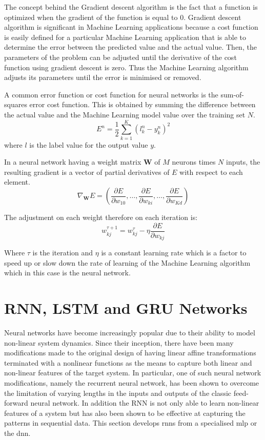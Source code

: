 The concept behind the Gradient descent algorithm is the fact that a function is optimized when the gradient of the function is equal to $0$.  Gradient descent algorithm is significant in Machine Learning applications because a cost function is easily defined for a particular Machine Learning application that is able to determine the error between the predicted value and the actual value.  Then, the parameters of the problem can be adjusted until the derivative of the cost function using gradient descent is zero.  Thus the Machine Learning algorithm adjusts its parameters until the error is minimised or removed.

A common error function or cost function for neural networks is the sum-of-squares error cost function.  This is obtained by summing the difference between the actual value and the Machine Learning model value over the training set $N$. 
\begin{equation}
E^n=\frac{1}{2}\sum_{k=1}^K(l_k^n-y_k^n)^2
\label{eqn_c3_nn_09}\end{equation}
where $l$ is the label value for the output value $y$.

In a neural network having a weight matrix $\mathbf{W}$ of $M$ neurons times $N$ inputs, the resulting gradient is a vector of partial derivatives of $E$ with respect to each element.  
\begin{equation}\nabla_{\mathbf{W}}E=\left(\frac{\partial E}{\partial w_{10}},\dots,\frac{\partial E}{\partial w_{ki}},\dots,\frac{\partial E}{\partial w_{Kd}}\right) 
\label{eqn_c3_nn_10}\end{equation}

The adjustment on each weight therefore on each iteration is:
\begin{equation}
w_{kj}^{\tau+1}=w_{kj}^{\tau}-\eta\frac{\partial E}{\partial w_{kj}}
\label{eqn_c3_nn_11}\end{equation}

Where $\tau$ is the iteration and $\eta$ is a constant learning rate which is a factor to speed up or slow down the rate of learning of the Machine Learning algorithm which in this case is the neural network.

\section{RNN, LSTM and GRU Networks}
Neural networks have become increasingly popular due to their ability to model non-linear system dynamics. Since their inception, there have been many modifications made to the original design of having linear affine transformations terminated with a nonlinear functions as the means to capture both linear and non-linear features of the target system. In particular, one of such neural network  modifications, namely the recurrent neural network, has been shown to overcome the limitation of varying lengths in the inputs and outputs of the classic feed-forward neural network.  In addition the RNN is not only able to learn non-linear features of a system but has also been shown to be effective at capturing the patterns in sequential data.  This section develops \acrshort{rnn}s from a specialised \acrshort{mlp} or the \acrshort{dnn}.

